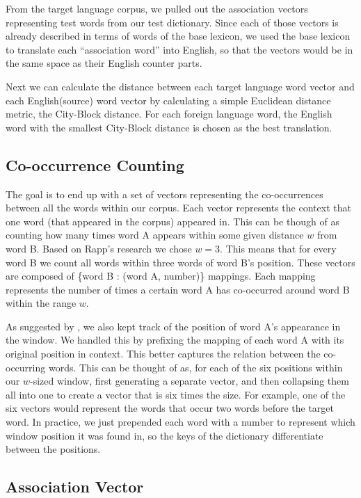\documentclass[12pt]{article}
\begin{document}

From the target language corpus, we pulled out the association vectors representing test words from our test dictionary. Since each of those vectors is already described in terms of words of the base lexicon, we used the base lexicon to translate each ``association word'' into English, so that the vectors would be in the same space as their English counter parts.

Next we can calculate the distance between each target language word vector and each English(source) word vector by calculating a simple Euclidean distance metric, the City-Block distance. For each foreign language word, the English word with the smallest City-Block distance is chosen as the best translation.

\subsection{Co-occurrence Counting}

The goal is to end up with a set of vectors representing the co-occurrences between all the words within our corpus. Each vector represents the context that one word (that appeared in the corpus) appeared in. This can be though of as counting how many times word A appears within some given distance $w$ from word B. Based on Rapp's research we chose $w=3$. This means that for every word B we count all words within three words of word B's position. These vectors are composed of \{word B : (word A, number)\} mappings. Each mapping represents the number of times a certain word A has co-occurred around word B within the range $w$.

As suggested by \cite{rapp1999automatic}, we also kept track of the position of word A's appearance in the window. We handled this by prefixing the mapping of each word A with its original position in context. This better captures the relation between the co-occurring words. This can be thought of as, for each of the six positions within our $w$-sized window, first generating a separate vector, and then collapsing them all into one to create a vector that is six times the size. For example, one of the six vectors would represent the words that occur two words before the target word. In practice, we just prepended each word with a number to represent which window position it was found in, so the keys of the dictionary differentiate between the positions.

\subsection{Association Vector}
\end{document}
